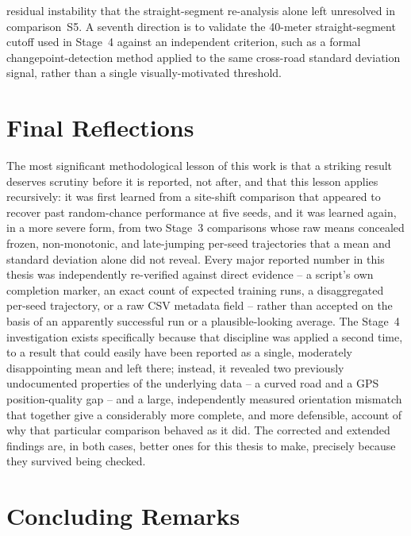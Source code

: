 \documentclass{iutbscthesis}
\begin{document}
residual instability that the straight-segment re-analysis alone left unresolved in comparison~S5. A seventh direction is to validate the 40-meter straight-segment cutoff used in Stage~4 against an independent criterion, such as a formal changepoint-detection method applied to the same cross-road standard deviation signal, rather than a single visually-motivated threshold.

\section{Final Reflections}

The most significant methodological lesson of this work is that a striking result deserves scrutiny before it is reported, not after, and that this lesson applies recursively: it was first learned from a site-shift comparison that appeared to recover past random-chance performance at five seeds, and it was learned again, in a more severe form, from two Stage~3 comparisons whose raw means concealed frozen, non-monotonic, and late-jumping per-seed trajectories that a mean and standard deviation alone did not reveal. Every major reported number in this thesis was independently re-verified against direct evidence -- a script's own completion marker, an exact count of expected training runs, a disaggregated per-seed trajectory, or a raw CSV metadata field -- rather than accepted on the basis of an apparently successful run or a plausible-looking average. The Stage~4 investigation exists specifically because that discipline was applied a second time, to a result that could easily have been reported as a single, moderately disappointing mean and left there; instead, it revealed two previously undocumented properties of the underlying data -- a curved road and a GPS position-quality gap -- and a large, independently measured orientation mismatch that together give a considerably more complete, and more defensible, account of why that particular comparison behaved as it did. The corrected and extended findings are, in both cases, better ones for this thesis to make, precisely because they survived being checked.

\section{Concluding Remarks}
\end{document}
